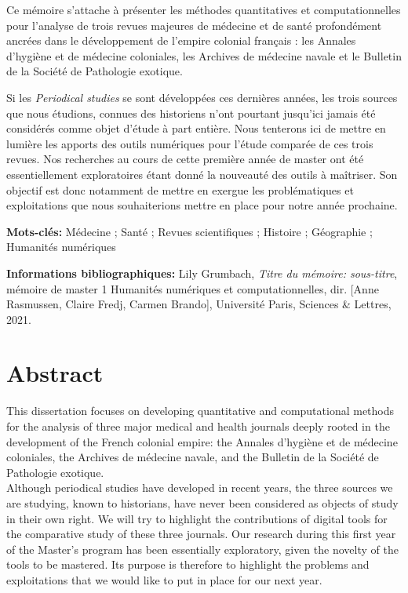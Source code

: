 \documentclass[a4paper,oneside,12pt]{book}
\begin{document}
Ce mémoire s'attache à présenter les méthodes quantitatives et computationnelles pour l'analyse de trois revues majeures de médecine et de santé profondément ancrées dans le développement de l'empire colonial français : les Annales d'hygiène et de médecine coloniales, les Archives de médecine navale et le Bulletin de la Société de Pathologie exotique. 
 
Si les \textit{Periodical studies} se sont développées ces dernières années, les trois sources que nous étudions, connues des historiens n'ont pourtant jusqu'ici jamais été considérés comme objet d'étude à part entière. 
Nous tenterons ici de mettre en lumière les apports des outils numériques pour l'étude comparée de ces trois revues. Nos recherches au cours de cette première année de master ont été essentiellement exploratoires étant donné la nouveauté des outils à maîtriser. Son objectif est donc notamment de mettre en exergue les problématiques et exploitations que nous souhaiterions mettre en place pour notre année prochaine. \\

\medskip

\textbf{Mots-clés:} Médecine ; Santé ; Revues scientifiques ; Histoire ; Géographie ; Humanités numériques

\textbf{Informations bibliographiques:} Lily Grumbach, \textit{Titre du mémoire: sous-titre}, mémoire de master 1 \og Humanités numériques et computationnelles\fg{}, dir. [Anne Rasmussen, Claire Fredj, Carmen Brando], Université Paris, Sciences \& Lettres, 2021.


\section*{Abstract}

This dissertation focuses on developing quantitative and computational methods for the analysis of three major medical and health journals deeply rooted in the development of the French colonial empire: the Annales d'hygiène et de médecine coloniales, the Archives de médecine navale, and the Bulletin de la Société de Pathologie exotique. \\
Although periodical studies have developed in recent years, the three sources we are studying, known to historians, have never been considered as objects of study in their own right. We will try to highlight the contributions of digital tools for the comparative study of these three journals. Our research during this first year of the Master's program has been essentially exploratory, given the novelty of the tools to be mastered. Its purpose is therefore to highlight the problems and exploitations that we would like to put in place for our next year. 
\end{document}
